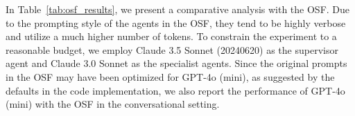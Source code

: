 In Table~\ref{tab:osf_results}, we present a comparative analysis with the OSF. Due to the prompting style of the agents in the OSF, they tend to be highly verbose and utilize a much higher number of tokens. To constrain the experiment to a reasonable budget, we employ Claude 3.5 Sonnet (20240620) as the supervisor agent and Claude 3.0 Sonnet as the specialist agents. Since the original prompts in the OSF may have been optimized for GPT-4o (mini), as suggested by the defaults in the code implementation, we also report the performance of GPT-4o (mini) with the OSF in the conversational setting.